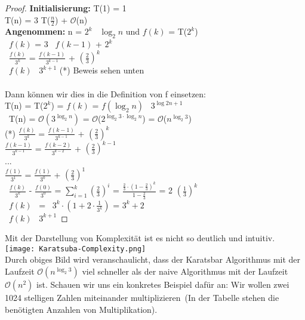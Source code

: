 \documentclass[11pt,a4paper, twoside]{article}
\theoremstyle{definition}
\begin{document}
\begin{proof}
\textbf{Initialisierung:} T(1) = 1\\
T(n) = 3 \cdot T($\frac{n}{2}$) + $\mathcal{O}$(n)\\
\textbf{Angenommen: } n = $2^{k}$ \Leftrightarrow \ $\log_{2}{n}$ und $f(k)$ = T($2^{k}$)\\
\Rightarrow \ $f(k)$ = 3 \cdot \ $f(k - 1)$ + $2^{k}$\\
\Leftrightarrow \ $\frac{f(k)}{3^{k}}$ = $\frac{f(k - 1)}{3^{k-1}}$ + $(\frac{2}{3})^{k}$\\
\Rightarrow \ $f(k)$ \leqslant \ $3^{k+1}$ \quad (*) Beweis sehen unten\\\\
Dann können wir dies in die Definition von f einsetzen: \\
T(n) = T($2^{k}$) = $f(k)$ = $f(\log_{2}{n})$ \leqslant \ $3^{\log{2}{n}+1}$\\
\Rightarrow \ T(n) = $\mathcal{O}(3^{\log_{2}{n}})$ = $\mathcal{O}$($2^{\log_{2}{3} \cdot \log_{2}{n}}$) = $\mathcal{O}$($n^{\log_{2}{3}}$)\\

(*) $\frac{f(k)}{3^{k}}$ = $\frac{f(k - 1)}{3^{k-1}}$ + $(\frac{2}{3})^{k}$\\
$\frac{f(k-1)}{3^{k-1}}$ = $\frac{f(k - 2)}{3^{k-2}}$ + $(\frac{2}{3})^{k-1}$\\
\quad ...\\
$\frac{f(1)}{3^{1}}$ = $\frac{f(1)}{3^{0}}$ + $(\frac{2}{3})^{1}$\\
\Rightarrow \ $\frac{f(k)}{3^{k}}$ - $\frac{f(0)}{3^{0}}$ = $\sum_{i = 1}^{k}(\frac{2}{3})^{i}$ = $\frac{\frac{2}{3} \cdot (1-\frac{2}{3})^k}{1-\frac{2}{3}}$ = 2 \cdot $(\frac{1}{3})^{k}$ \\
\Leftrightarrow \ $f(k)$ \ = \ $3^{k} \cdot (1 + 2 \cdot \frac{1}{3^{k}})$ = $3^{k} + 2$\\
\Rightarrow \ $f(k)$ \leqslant \ $3^{k+1}$
\end{proof}

Mit der Darstellung von Komplexität ist es nicht so deutlich und intuitiv.\\
\texttt{[image: Karatsuba-Complexity.png]} \cite{2}\\
Durch obiges Bild wird veranschaulicht, dass der Karatsbar Algorithmus mit der Laufzeit $\mathcal{O}(n^{\log_{2}{3}})$ viel schneller als der naive Algorithmus mit der Laufzeit $\mathcal{O}(n^{2})$ ist. Schauen wir uns ein konkretes Beispiel dafür an: Wir wollen zwei 1024 stelligen Zahlen miteinander multiplizieren\ (In der Tabelle \cite{1} stehen die benötigten Anzahlen von Multiplikation).\\
\end{document}
